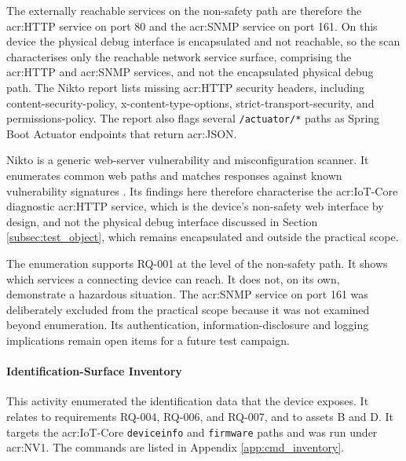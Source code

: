 The externally reachable services on the non-safety path are therefore the \gls{acr:HTTP} service on port 80 and the \gls{acr:SNMP} service on port 161. On this device the physical debug interface is encapsulated and not reachable, so the scan characterises only the reachable network service surface, comprising the \gls{acr:HTTP} and \gls{acr:SNMP} services, and not the encapsulated physical debug path. The Nikto report lists missing \gls{acr:HTTP} security headers, including content-security-policy, x-content-type-options, strict-transport-security, and permissions-policy. The report also flags several \texttt{/actuator/*} paths as Spring Boot Actuator endpoints that return \gls{acr:JSON}.

Nikto is a generic web-server vulnerability and misconfiguration scanner. It enumerates common web paths and matches responses against known vulnerability signatures \cite{nikto_overview}. Its findings here therefore characterise the \gls{acr:IoT}-Core diagnostic \gls{acr:HTTP} service, which is the device's non-safety web interface by design, and not the physical debug interface discussed in Section \ref{subsec:test_object}, which remains encapsulated and outside the practical scope.


The enumeration supports RQ-001 at the level of the non-safety path. It shows which services a connecting device can reach. It does not, on its own, demonstrate a hazardous situation. The \gls{acr:SNMP} service on port 161 was deliberately excluded from the practical scope because it was not examined beyond enumeration. Its authentication, information-disclosure and logging implications remain open items for a future test campaign.

\paragraph{Identification-Surface Inventory}
\label{subsec:res_identification}
This activity enumerated the identification data that the device exposes. It relates to requirements RQ-004, RQ-006, and RQ-007, and to assets B and D. It targets the \gls{acr:IoT}-Core \texttt{deviceinfo} and \texttt{firmware} paths and was run under \gls{acr:NV1}. The commands are listed in Appendix \ref{app:cmd_inventory}.

